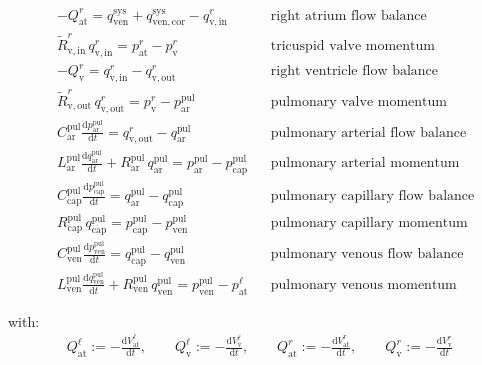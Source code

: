\documentclass[a4paper,12pt]{report}
\begin{document}
\begin{equation}
\label{equation-syspulcapcor-2}
\begin{aligned}
&-Q_{\mathrm{at}}^{r} = q_{\mathrm{ven}}^{\mathrm{sys}} + q_{\mathrm{ven,cor}}^{\mathrm{sys}} - q_{\mathrm{v,in}}^{r} && \text{right atrium flow balance}\nonumber\\
&\tilde{R}_{\mathrm{v,in}}^{r}\,q_{\mathrm{v,in}}^{r} = p_{\mathrm{at}}^{r}-p_{\mathrm{v}}^{r} && \text{tricuspid valve momentum}\\
&-Q_{\mathrm{v}}^{r} = q_{\mathrm{v,in}}^{r} - q_{\mathrm{v,out}}^{r} && \text{right ventricle flow balance}\\
&\tilde{R}_{\mathrm{v,out}}^{r}\,q_{\mathrm{v,out}}^{r} = p_{\mathrm{v}}^{r}-p_{\mathrm{ar}}^{\mathrm{pul}} && \text{pulmonary valve momentum}\\
&C_{\mathrm{ar}}^{\mathrm{pul}} \frac{\mathrm{d}p_{\mathrm{ar}}^{\mathrm{pul}}}{\mathrm{d}t} = q_{\mathrm{v,out}}^{r} - q_{\mathrm{ar}}^{\mathrm{pul}} && \text{pulmonary arterial flow balance}\\
&L_{\mathrm{ar}}^{\mathrm{pul}}\frac{\mathrm{d}q_{\mathrm{ar}}^{\mathrm{pul}}}{\mathrm{d}t} + R_{\mathrm{ar}}^{\mathrm{pul}}\,q_{\mathrm{ar}}^{\mathrm{pul}}=p_{\mathrm{ar}}^{\mathrm{pul}} -p_{\mathrm{cap}}^{\mathrm{pul}} && \text{pulmonary arterial momentum}\\
&C_{\mathrm{cap}}^{\mathrm{pul}} \frac{\mathrm{d}p_{\mathrm{cap}}^{\mathrm{pul}}}{\mathrm{d}t} = q_{\mathrm{ar}}^{\mathrm{pul}} - q_{\mathrm{cap}}^{\mathrm{pul}} && \text{pulmonary capillary flow balance}\\
&R_{\mathrm{cap}}^{\mathrm{pul}}\,q_{\mathrm{cap}}^{\mathrm{pul}}=p_{\mathrm{cap}}^{\mathrm{pul}}-p_{\mathrm{ven}}^{\mathrm{pul}} && \text{pulmonary capillary momentum}\\
&C_{\mathrm{ven}}^{\mathrm{pul}} \frac{\mathrm{d}p_{\mathrm{ven}}^{\mathrm{pul}}}{\mathrm{d}t} = q_{\mathrm{cap}}^{\mathrm{pul}} - q_{\mathrm{ven}}^{\mathrm{pul}} && \text{pulmonary venous flow balance}\\
&L_{\mathrm{ven}}^{\mathrm{pul}}\frac{\mathrm{d}q_{\mathrm{ven}}^{\mathrm{pul}}}{\mathrm{d}t} + R_{\mathrm{ven}}^{\mathrm{pul}}\, q_{\mathrm{ven}}^{\mathrm{pul}}=p_{\mathrm{ven}}^{\mathrm{pul}}-p_{\mathrm{at}}^{\ell} && \text{pulmonary venous momentum}
\end{aligned}
\end{equation}

with:
\begin{equation}
\begin{aligned}
Q_{\mathrm{at}}^{\ell} := -\frac{\mathrm{d}V_{\mathrm{at}}^{\ell}}{\mathrm{d}t}, \qquad
Q_{\mathrm{v}}^{\ell} := -\frac{\mathrm{d}V_{\mathrm{v}}^{\ell}}{\mathrm{d}t}, \qquad
Q_{\mathrm{at}}^{r} := -\frac{\mathrm{d}V_{\mathrm{at}}^{r}}{\mathrm{d}t}, \qquad
Q_{\mathrm{v}}^{r} := -\frac{\mathrm{d}V_{\mathrm{v}}^{r}}{\mathrm{d}t} 
\end{aligned}
\end{equation}
\end{document}
